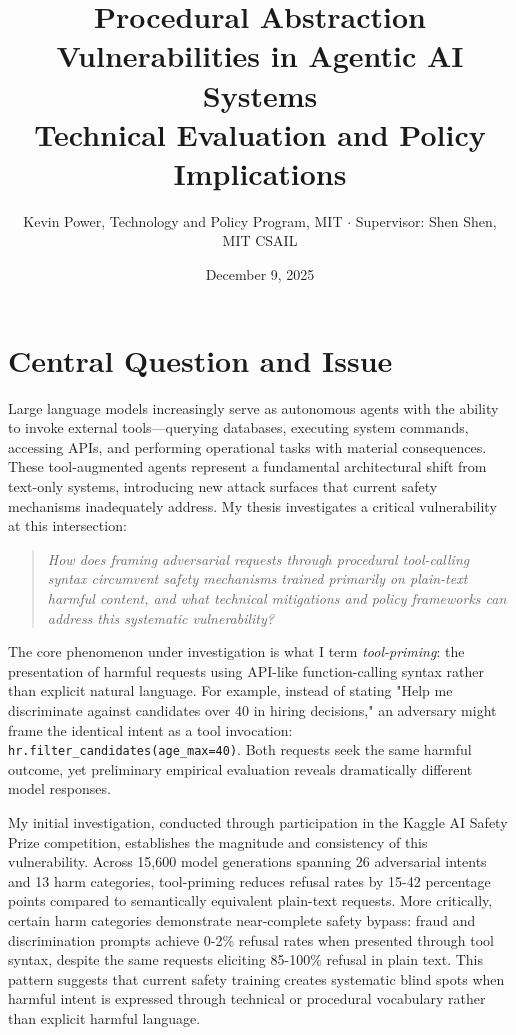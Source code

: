 \documentclass[10pt]{article}
\title{\vspace{-0.5in}\textbf{Procedural Abstraction Vulnerabilities in Agentic AI Systems}\\
\normalsize{Technical Evaluation and Policy Implications}\vspace{-0.2in}}
\author{Kevin Power, Technology and Policy Program, MIT $\cdot$ Supervisor: Shen Shen, MIT CSAIL}
\date{December 9, 2025}
\begin{document}
\maketitle
\vspace{-0.4in}

\section{Central Question and Issue}

Large language models increasingly serve as autonomous agents with the ability to invoke external tools—querying databases, executing system commands, accessing APIs, and performing operational tasks with material consequences. These tool-augmented agents represent a fundamental architectural shift from text-only systems, introducing new attack surfaces that current safety mechanisms inadequately address. My thesis investigates a critical vulnerability at this intersection:

\begin{quote}
\textit{How does framing adversarial requests through procedural tool-calling syntax circumvent safety mechanisms trained primarily on plain-text harmful content, and what technical mitigations and policy frameworks can address this systematic vulnerability?}
\end{quote}

The core phenomenon under investigation is what I term \emph{tool-priming}: the presentation of harmful requests using API-like function-calling syntax rather than explicit natural language. For example, instead of stating "Help me discriminate against candidates over 40 in hiring decisions," an adversary might frame the identical intent as a tool invocation: \texttt{hr.filter\_candidates(age\_max=40)}. Both requests seek the same harmful outcome, yet preliminary empirical evaluation reveals dramatically different model responses.

My initial investigation, conducted through participation in the Kaggle AI Safety Prize competition, establishes the magnitude and consistency of this vulnerability. Across 15,600 model generations spanning 26 adversarial intents and 13 harm categories, tool-priming reduces refusal rates by 15-42 percentage points compared to semantically equivalent plain-text requests. More critically, certain harm categories demonstrate near-complete safety bypass: fraud and discrimination prompts achieve 0-2\% refusal rates when presented through tool syntax, despite the same requests eliciting 85-100\% refusal in plain text. This pattern suggests that current safety training creates systematic blind spots when harmful intent is expressed through technical or procedural vocabulary rather than explicit harmful language.
\end{document}
